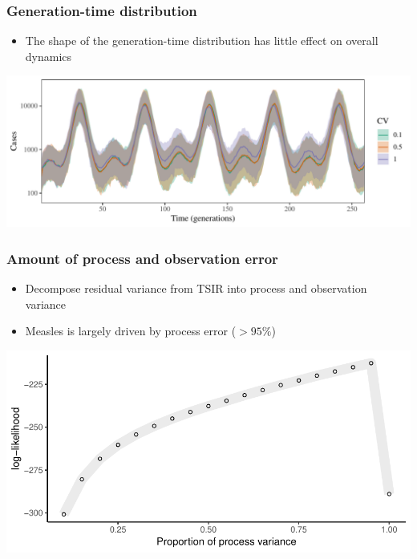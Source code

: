 \documentclass{beamer}
\begin{document}
\begin{frame}
\frametitle{Generation-time distribution}
\begin{itemize}
	\item The shape of the generation-time distribution has little effect on overall dynamics
\end{itemize}
\begin{center}
\includegraphics[width=\textwidth]{../figure/test_renewal_distribution.pdf}
\end{center}
\end{frame}

\begin{frame}
\frametitle{Amount of process and observation error}
\begin{itemize}
	\item Decompose residual variance from TSIR into process and observation variance
	\item Measles is largely driven by process error ($> 95\%$)
\end{itemize}
\begin{center}
\includegraphics[width=\textwidth]{process.pdf}
\end{center}
\end{frame}
\end{document}
